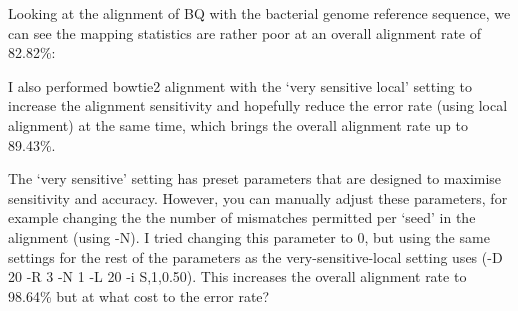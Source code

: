 \documentclass[]{article}
\newenvironment{Shaded}{\begin{snugshade}}{\end{snugshade}}
\newcommand{\FunctionTok}[1]{\textcolor[rgb]{0.00,0.00,0.00}{#1}}
\newcommand{\VariableTok}[1]{\textcolor[rgb]{0.00,0.00,0.00}{#1}}
\newcommand{\OperatorTok}[1]{\textcolor[rgb]{0.81,0.36,0.00}{\textbf{#1}}}
\newcommand{\BuiltInTok}[1]{#1}
\newcommand{\NormalTok}[1]{#1}
\begin{document}
Looking at the alignment of BQ with the bacterial genome reference
sequence, we can see the mapping statistics are rather poor at an
overall alignment rate of 82.82\%:

\begin{Shaded}
\end{Shaded}

I also performed bowtie2 alignment with the `very sensitive local'
setting to increase the alignment sensitivity and hopefully reduce the
error rate (using local alignment) at the same time, which brings the
overall alignment rate up to 89.43\%.

\begin{Shaded}
\end{Shaded}

The `very sensitive' setting has preset parameters that are designed to
maximise sensitivity and accuracy. However, you can manually adjust
these parameters, for example changing the the number of mismatches
permitted per `seed' in the alignment (using -N). I tried changing this
parameter to 0, but using the same settings for the rest of the
parameters as the very-sensitive-local setting uses (-D 20 -R 3 -N 1 -L
20 -i S,1,0.50). This increases the overall alignment rate to 98.64\%
but at what cost to the error rate?

\begin{Shaded}
\end{Shaded}
\end{document}
